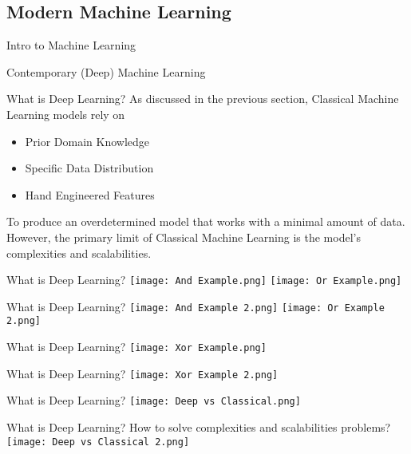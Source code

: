 \documentclass{beamer}
\begin{document}
\subsection{Modern Machine Learning}
\begin{frame}[fragile]{Intro to Machine Learning}
    \begin{center}
        \Huge Contemporary (Deep) Machine Learning
    \end{center}
\end{frame}
\begin{frame}[fragile]{What is Deep Learning?}
    As discussed in the previous section, Classical Machine Learning models rely on 
    \begin{itemize}
        \item Prior Domain Knowledge
        \item Specific Data Distribution
        \item Hand Engineered Features
    \end{itemize}
    To produce an overdetermined model that works with a minimal amount of data. However, the primary limit of Classical Machine Learning is the model's complexities and scalabilities.
\end{frame}
\begin{frame}[fragile]{What is Deep Learning?}
    \texttt{[image: And Example.png]}
    \texttt{[image: Or Example.png]}
\end{frame}
\begin{frame}[fragile]{What is Deep Learning?}
    \texttt{[image: And Example 2.png]}
    \texttt{[image: Or Example 2.png]}
\end{frame}
\begin{frame}[fragile]{What is Deep Learning?}
    \texttt{[image: Xor Example.png]}
\end{frame}
\begin{frame}[fragile]{What is Deep Learning?}
    \texttt{[image: Xor Example 2.png]}
\end{frame}
\begin{frame}[fragile]{What is Deep Learning?}
    \texttt{[image: Deep vs Classical.png]}
\end{frame}
\begin{frame}[fragile]{What is Deep Learning?}
    How to solve complexities and scalabilities problems?
    \texttt{[image: Deep vs Classical 2.png]}
\end{frame}
\end{document}
